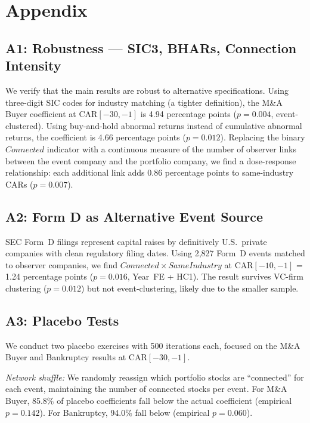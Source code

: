 \section*{Appendix}

\subsection*{A1: Robustness --- SIC3, BHARs, Connection Intensity}

We verify that the main results are robust to alternative specifications. Using three-digit SIC codes for industry matching (a tighter definition), the M\&A Buyer coefficient at CAR$[-30,-1]$ is 4.94 percentage points ($p=0.004$, event-clustered). Using buy-and-hold abnormal returns instead of cumulative abnormal returns, the coefficient is 4.66 percentage points ($p=0.012$). Replacing the binary $Connected$ indicator with a continuous measure of the number of observer links between the event company and the portfolio company, we find a dose-response relationship: each additional link adds 0.86 percentage points to same-industry CARs ($p=0.007$).

\subsection*{A2: Form D as Alternative Event Source}

SEC Form~D filings represent capital raises by definitively U.S.\ private companies with clean regulatory filing dates. Using 2,827 Form~D events matched to observer companies, we find $Connected \times SameIndustry$ at CAR$[-10,-1]$ = 1.24 percentage points ($p=0.016$, Year~FE + HC1). The result survives VC-firm clustering ($p=0.012$) but not event-clustering, likely due to the smaller sample.

\subsection*{A3: Placebo Tests}

We conduct two placebo exercises with 500 iterations each, focused on the M\&A Buyer and Bankruptcy results at CAR$[-30,-1]$.

\textit{Network shuffle:} We randomly reassign which portfolio stocks are ``connected'' for each event, maintaining the number of connected stocks per event. For M\&A Buyer, 85.8\% of placebo coefficients fall below the actual coefficient (empirical $p=0.142$). For Bankruptcy, 94.0\% fall below (empirical $p=0.060$).

